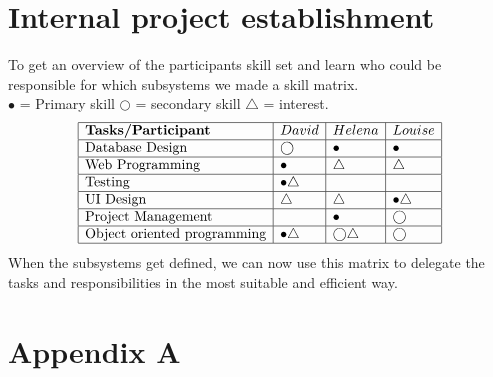 \documentclass[12pt]{article}
\begin{document}
\section{Internal project establishment}
To get an overview of the participants skill set and learn who could be responsible for which subsystems we made a skill matrix.\\

$\bullet$ = Primary skill \quad $\bigcirc$ = secondary skill \quad $\bigtriangleup$ = interest.
\[
\begin{array}{|l|l|l|l|}
\hline
\textbf{Tasks/Participant} & David & Helena & Louise\\
\hline
\text{Database Design} & \bigcirc & \bullet & \bullet\\
\hline
\text{Web Programming} & \bullet & \bigtriangleup & \bigtriangleup\\
\hline
\text{Testing} & \bullet \bigtriangleup & & \\
\hline
\text{UI Design} & \bigtriangleup & \bigtriangleup & \bullet \bigtriangleup\\
\hline
\text{Project Management} & & \bullet & \bigcirc\\
\hline
\text{Object oriented programming} & \bullet \bigtriangleup& \bigcirc \bigtriangleup & \bigcirc \\
\hline
\end{array}
\]
When the subsystems get defined, we can now use this matrix to delegate the tasks and responsibilities in the most suitable and efficient way.
\section{Appendix A}
\end{document}

